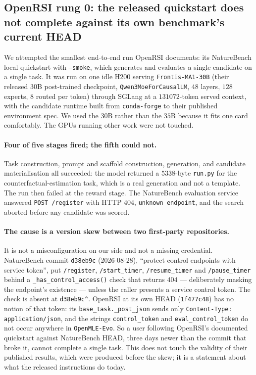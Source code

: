 \subsection{OpenRSI rung 0: the released quickstart does not complete against its own
benchmark's current HEAD}
\label{sec:openrsirung0}

We attempted the smallest end-to-end run OpenRSI documents: its NatureBench local
quickstart with \texttt{--smoke}, which generates and evaluates a single candidate on a
single task. It was run on one idle H200 serving \texttt{Frontis-MA1-30B} (their released
$30$B post-trained checkpoint, \texttt{Qwen3MoeForCausalLM}, $48$ layers, $128$ experts,
$8$ routed per token) through SGLang at a $131072$-token served context, with the
candidate runtime built from \texttt{conda-forge} to their published environment spec. We
used the $30$B rather than the $35$B because it fits one card comfortably. The GPUs
running other work were not touched.

\paragraph{Four of five stages fired; the fifth could not.} Task construction, prompt and
scaffold construction, generation, and candidate materialisation all succeeded: the model
returned a $5338$-byte \texttt{run.py} for the counterfactual-estimation task, which is a
real generation and not a template. The run then failed at the reward stage. The
NatureBench evaluation service answered \texttt{POST /register} with HTTP $404$,
\texttt{unknown endpoint}, and the search aborted before any candidate was scored.

\paragraph{The cause is a version skew between two first-party repositories.} It is not a
misconfiguration on our side and not a missing credential. NatureBench commit
\texttt{d38eb9c} (2026-08-28), ``protect control endpoints with service token'', put
\texttt{/register}, \texttt{/start\_timer}, \texttt{/resume\_timer} and
\texttt{/pause\_timer} behind a \texttt{\_has\_control\_access()} check that returns $404$
--- deliberately masking the endpoint's existence --- unless the caller presents a service
control token. The check is absent at \texttt{d38eb9c\^{}}. OpenRSI at its own HEAD
(\texttt{1f477c48}) has no notion of that token: its
\texttt{base\_task.\_post\_json} sends only \texttt{Content-Type: application/json}, and
the strings \texttt{control\_token} and \texttt{eval\_control\_token} do not occur anywhere
in \texttt{OpenMLE-Evo}. So a user following OpenRSI's documented quickstart against
NatureBench HEAD, three days newer than the commit that broke it, cannot complete a single
task. This does not touch the validity of their published results, which were produced
before the skew; it is a statement about what the released instructions do today.

